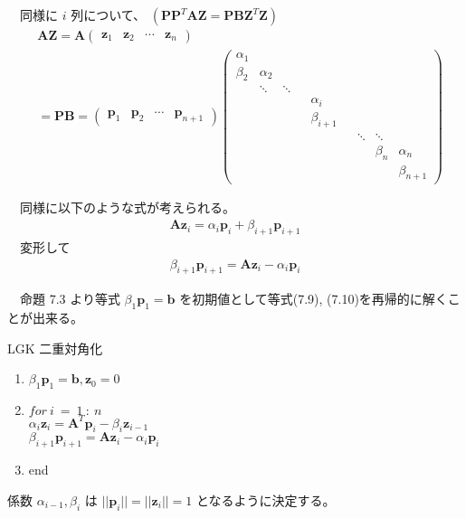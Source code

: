 \documentclass[dvipdfmx,10pt,presentation]{beamer}
\begin{document}
\begin{frame}[label={sec:org9798cb0}]{}
　同様に \(i\) 列について、 \((\bm{P}\bm{P}^T\bm{A}\bm{Z}=\bm{P}\bm{B}\bm{Z}^T\bm{Z})\)\\
\begin{align*}
&\bm{A}\bm{Z}
= \bm{A}
\begin{pmatrix}
\bm{z}_1 & \bm{z}_2 & \cdots & \bm{z}_n
\end{pmatrix} \\ 
&= \bm{P}\bm{B} = 
\begin{pmatrix}
\bm{p}_1 & \bm{p}_2 & \cdots & \bm{p}_{n+1}
\end{pmatrix}
\begin{pmatrix}
\alpha_1 &&&&&&& \\
\beta_2 & \alpha_2 &&&&&& \\
& \ddots & \ddots &&&&&\\
&&&& \alpha_i &&& \\
&&&& \beta_{i+1} &&& \\
&&&&&& \ddots & \ddots &\\
&&&&&&& \beta_n & \alpha_n \\
&&&&&&&& \beta_{n+1}
\end{pmatrix}
\end{align*}
\end{frame}
\begin{frame}[label={sec:orgba4d5c3}]{}
　同様に以下のような式が考えられる。\\
\begin{align*}
\bm{A}\bm{z}_i = \alpha_i\bm{p}_i + \beta_{i+1}\bm{p}_{i+1}
\end{align*}
　変形して\\
\begin{align*}
\beta_{i+1}\bm{p}_{i+1}=\bm{A}\bm{z}_i -\alpha_i\bm{p}_i \tag{7.10}
\end{align*}
\end{frame}

\begin{frame}[label={sec:org76f9717}]{}
　命題 7.3 より等式 \(\beta_1\bm{p}_1 = \bm{b}\) を初期値として等式(7.9), (7.10)を再帰的に解くことが出来る。\\
\begin{block}{LGK 二重対角化}
\begin{enumerate}
\item \(\beta_1\bm{p}_1 = \bm{b}, \bm{z}_0 = 0\)\\
\item \(for\ i\ =\ 1\ :\ n\)\\
\(\alpha_i\bm{z}_i = \bm{A}^T\bm{p}_i-\beta_i\bm{z}_{i-1}\)  \\
\(\beta_{i+1}\bm{p}_{i+1} = \bm{A}\bm{z}_i- \alpha_{i}\bm{p}_i\)\\
\item end\\
\end{enumerate}

係数 \(\alpha_{i-1}, \beta_i\) は \(||\bm{p}_i|| = ||\bm{z}_i||=1\) となるように決定する。\\
\end{block}
\end{frame}
\end{document}
